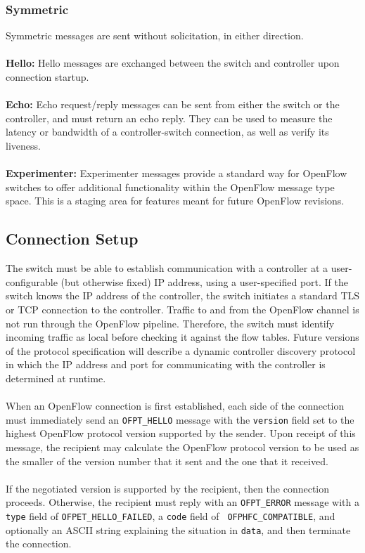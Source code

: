 \documentclass[10pt]{article}
\begin{document}
\subsubsection{Symmetric}
Symmetric messages are sent without solicitation, in either direction.
\\\\
\textbf{Hello:} Hello messages are exchanged between the switch and controller upon connection startup.
\\\\
\textbf{Echo:} Echo request/reply messages can be sent from either the switch or the controller, and must return an echo reply.  They can be used to measure the latency or bandwidth of a controller-switch connection, as well as verify its liveness.
\\\\
\textbf{Experimenter:} Experimenter messages provide a standard way for OpenFlow switches to offer additional functionality within the OpenFlow message type space.  This is a staging area for features meant for future OpenFlow revisions.

\subsection{Connection Setup}
The switch must be able to establish communication with a controller at a user-configurable (but otherwise fixed) IP address, using a user-specified port.  If the switch knows the IP address of the controller, the switch initiates a standard TLS or TCP connection to the controller.  Traffic to and from the OpenFlow channel is not run through the OpenFlow pipeline.  Therefore, the switch must identify incoming traffic as local before checking it against the flow tables.  Future versions of the protocol specification will describe a dynamic controller discovery protocol in which the IP address and port for communicating with the controller is determined at runtime.
\\\\
When an OpenFlow connection is first established, each side of the connection must immediately send an \verb|OFPT_HELLO| message with the \verb|version| field set to the highest OpenFlow protocol version supported by the sender.  Upon receipt of this message, the recipient may calculate the OpenFlow protocol version to be used as the smaller of the version number that it sent and the one that it received.
\\\\
If the negotiated version is supported by the recipient, then the connection proceeds. Otherwise, the recipient must reply with an \verb|OFPT_ERROR| message with a \verb|type| field of \verb|OFPET_HELLO_FAILED|, a \verb|code| field of \verb| OFPHFC_COMPATIBLE|, and optionally an ASCII string explaining the situation in \verb|data|, and then terminate the connection.
\end{document}
